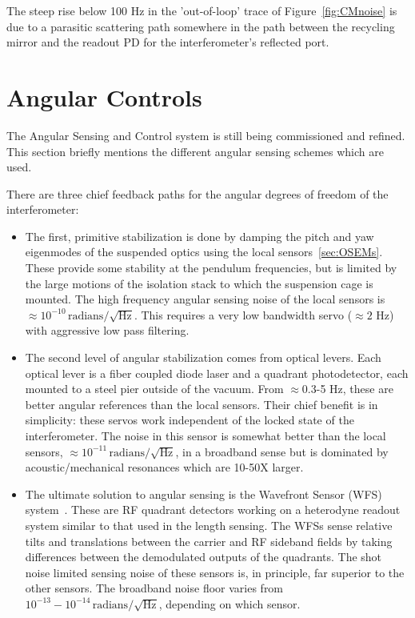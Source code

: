 The steep rise below 100 Hz in the 'out-of-loop' trace of Figure~\ref{fig:CMnoise} is due
to a parasitic scattering path somewhere in the path between the recycling
mirror and the readout PD for the interferometer's reflected port.


\section{Angular Controls}
\label{sec:ASC}

The Angular Sensing and Control system is still being commissioned and
refined. This section briefly mentions the different angular sensing
schemes which are used. 


There are three chief feedback paths for the angular degrees of freedom
of the interferometer:

\begin{itemize}

\item The first, primitive stabilization is done by damping the pitch
      and yaw eigenmodes of the suspended optics using the local 
      sensors~\ref{sec:OSEMs}. These provide some stability at the
      pendulum frequencies, but is limited by the large motions of the
      isolation stack to which the suspension cage is mounted. The high
      frequency angular sensing noise of the local sensors is
      $\approx10^{-10} \, \mbox{radians}/\sqrt{\mbox{Hz}}$. This requires
      a very low bandwidth servo ($\approx 2$ Hz) with aggressive low
      pass filtering.

\item The second level of angular stabilization comes from optical levers.
      Each optical lever is a fiber coupled diode laser and a
      quadrant photodetector, each mounted to a steel pier outside
      of the vacuum. From $\approx$0.3-5 Hz, these are better angular
      references than the local sensors. Their chief benefit is in simplicity:
      these servos work independent of the locked state of the interferometer.
      The noise in this sensor is somewhat better than the local sensors,
      $\approx10^{-11} \, \mbox{radians}/\sqrt{\mbox{Hz}}$, in a broadband
      sense but is dominated by acoustic/mechanical resonances which
      are 10-50X larger.

\item The ultimate solution to angular sensing is the Wavefront Sensor (WFS)
      system~\cite{Yaron:Alignment,Alignment:Applied,Nergis:Thesis}. These are 
      RF quadrant detectors working
      on a heterodyne readout system similar to that used in the length
      sensing. The WFSs sense relative tilts and translations between the carrier
      and RF sideband fields by taking differences between the demodulated outputs
      of the quadrants. The shot noise limited sensing noise of these sensors
      is, in principle, far superior to the other sensors. The broadband
      noise floor varies from $10^{-13} - 10^{-14} \, \mbox{radians}/\sqrt{\mbox{Hz}}$,
      depending on which sensor.


\end{itemize}
